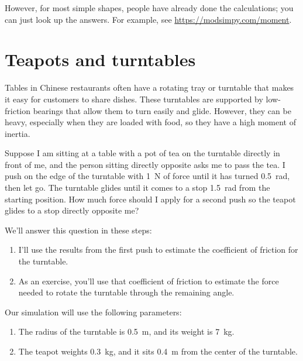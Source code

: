 \documentclass[12pt]{book}
\theoremstyle{exercise}
\begin{document}
However, for most simple shapes, people have already done the calculations; you can just look up the answers.  For example, see \url{https://modsimpy.com/moment}.


\section{Teapots and turntables}

Tables in Chinese restaurants often have a rotating tray or turntable
that makes it easy for customers to share dishes. These turntables are
supported by low-friction bearings that allow them to turn easily and
glide. However, they can be heavy, especially when they are loaded with
food, so they have a high moment of inertia.


Suppose I am sitting at a table with a pot of tea on the turntable
directly in front of me, and the person sitting directly opposite asks
me to pass the tea. I push on the edge of the turntable with \SI{1}{\newton} of force until it has turned \SI{0.5}{\radian}, then let go. The turntable glides until it comes to a stop \SI{1.5}{\radian} from the starting position. How much force should I apply for a second push so the teapot glides to a
stop directly opposite me?


We'll answer this question in these steps:

\begin{enumerate}

\item
  I'll use the results from the first push to estimate the coefficient
  of friction for the turntable.

\item
  As an exercise, you'll use that coefficient of friction to estimate the force needed to rotate the turntable through the remaining angle.

\end{enumerate}

Our simulation will use the following parameters:

\begin{enumerate}
\item
  The radius of the turntable is \SI{0.5}{\meter}, and its weight is \SI{7}{\kg}.
\item
  The teapot weights \SI{0.3}{\kg}, and it sits \SI{0.4}{\meter} from the center of
  the turntable.
\end{enumerate}
\end{document}

